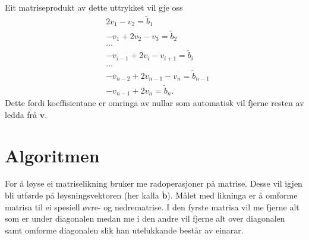 \documentclass[11pt, a4paper]{article}
\begin{document}
  Eit matriseprodukt av dette uttrykket vil gje oss
  \begin{equation*}
    \begin{align}
      &2v_1 - v_2 = \tilde{b}_1 \\
      &-v_1 + 2v_2 - v_3 = \tilde{b}_2 \\
      &\dots \\
      &-v_{i-1} + 2v_i - v_{i+1} = \tilde{b}_i \\
      &\dots \\
      &-v_{n-2} + 2v_{n-1} -v_{n} = \tilde{b}_{n-1} \\
      &-v_{n-1} + 2v_{n} = \tilde{b}_n.
    \end{align}
  \end{equation*}
  Dette fordi koeffisientane er omringa av nullar som automatisk vil fjerne resten av ledda frå 
  $\mathbf{v}$.

\section{Algoritmen}
  For å løyse ei matriselikning bruker me radoperasjoner på matrise. Desse vil igjen bli utførde på
  løysningsvektoren (her kalla $\mathbf{\tilde{b}}$). Målet med likninga er å omforme matrisa til ei spesiell øvre-  og nedrematrise. I den fyrste matrisa vil me fjerne alt som er under diagonalen medan me i den andre
  vil fjerne alt over diagonalen samt omforme diagonalen slik han utelukkande består av einarar.
\end{document}
